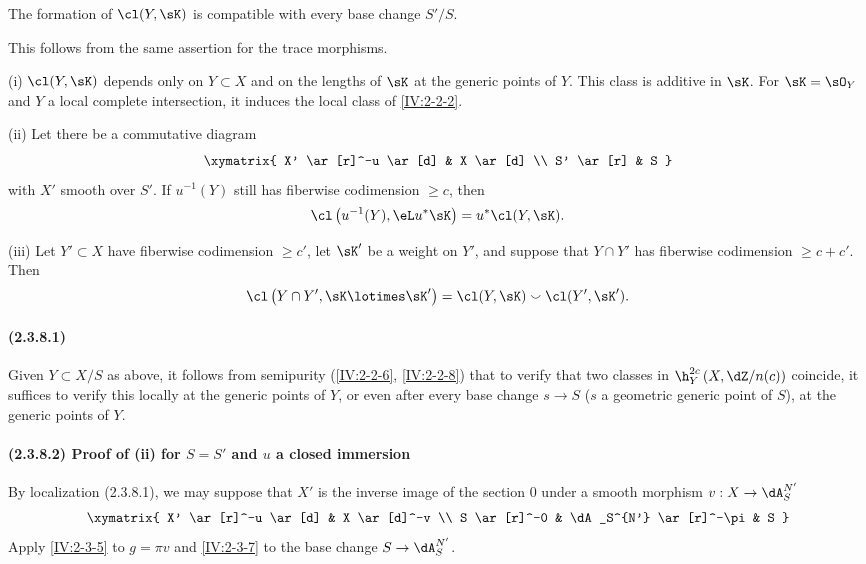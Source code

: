 \begin{lemma}\label{IV:2-3-7}
The formation of $\cl(Y,\sK)$ is compatible with every base change $S'/S$.
\end{lemma}

This follows from the same assertion for the trace morphisms.






\begin{theorem}\label{IV:2-3-8}
(i) $\cl(Y,\sK)$ depends only on $Y\subset X$ and on the lengths of $\sK$ at
the generic points of $Y$. This class is additive in $\sK$. For
$\sK=\sO_Y$ and $Y$ a local complete intersection, it induces the local
class of \ref{IV:2-2-2}.

(ii) Let there be a commutative diagram
\[\xymatrix{
  X' \ar[r]^-u \ar[d]
    & X \ar[d] \\
  S' \ar[r]
    & S
}\]
with $X'$ smooth over $S'$. If $u^{-1}(Y)$ still has fiberwise codimension
$\geqslant c$, then
\[
  \cl\left(u^{-1}(Y),\eL u^\ast\sK\right) = u^\ast \cl(Y,\sK) \text{.}
\]

(iii) Let $Y'\subset X$ have fiberwise codimension $\geqslant c'$, let
$\sK'$ be a weight on $Y'$, and suppose that $Y\cap Y'$ has fiberwise
codimension $\geqslant c+c'$. Then
\[
\cl\left(Y\cap Y',\sK\lotimes \sK'\right) = \cl(Y,\sK) \smallsmile \cl(Y',\sK') \text{.}
\]
\end{theorem}




\paragraph{(2.3.8.1)}\label{IV:2-3-8-1}
Given $Y\subset X/S$ as above, it follows from semipurity
(\ref{IV:2-2-6}, \ref{IV:2-2-8}) that to verify that two classes in
$\h_Y^{2 c}\left(X,\dZ/n(c)\right)$ coincide, it suffices to verify this
locally at the generic points of $Y$, or even after every base change
$s\to S$ ($s$ a geometric generic point of $S$), at the generic points of
$Y$.

\paragraph{(2.3.8.2) Proof of (ii) for $S=S'$ and $u$ a closed immersion}
By localization (2.3.8.1), we may suppose that $X'$ is the inverse image of the
section $0$ under a smooth morphism $v:X\to \dA_S^{N'}$
\[\xymatrix{
  X' \ar[r]^-u \ar[d]
    & X \ar[d]^-v \\
  S \ar[r]^-0
    & \dA_S^{N'} \ar[r]^-\pi
    & S
}\]
Apply \ref{IV:2-3-5} to $g=\pi v$ and \ref{IV:2-3-7} to the base change
$S\to \dA_S^{N'}$.

